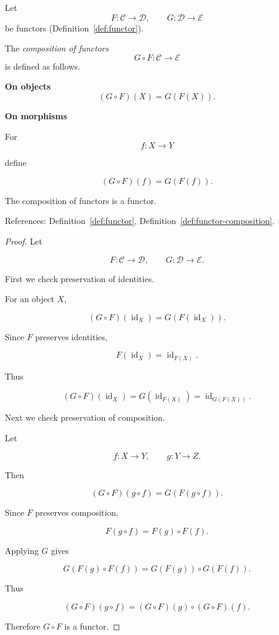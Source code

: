 \begin{definition}
\label{def:functor-composition}

Let
$$
F : \mathcal{C} \to \mathcal{D},
\qquad
G : \mathcal{D} \to \mathcal{E}
$$
be functors (Definition~\ref{def:functor}).

The \emph{composition of functors}
$$
G \circ F : \mathcal{C} \to \mathcal{E}
$$
is defined as follows.

\textbf{On objects}
$$
(G \circ F)(X) = G(F(X)).
$$

\textbf{On morphisms}

For
$$
f : X \to Y
$$

define

$$
(G \circ F)(f) = G(F(f)).
$$

\end{definition}

\begin{lemma}
\label{lem:functor-composition}

The composition of functors is a functor.

References: Definition~\ref{def:functor}, Definition~\ref{def:functor-composition}.
\end{lemma}

\begin{proof}

Let

$$
F : \mathcal{C} \to \mathcal{D},
\qquad
G : \mathcal{D} \to \mathcal{E}.
$$

First we check preservation of identities.

For an object $X$,

$$
(G \circ F)(\operatorname{id}_X)
=
G(F(\operatorname{id}_X)).
$$

Since $F$ preserves identities,

$$
F(\operatorname{id}_X) = \operatorname{id}_{F(X)}.
$$

Thus

$$
(G \circ F)(\operatorname{id}_X)
=
G(\operatorname{id}_{F(X)})
=
\operatorname{id}_{G(F(X))}.
$$

Next we check preservation of composition.

Let

$$
f : X \to Y,
\qquad
g : Y \to Z.
$$

Then

$$
(G \circ F)(g \circ f)
=
G(F(g \circ f)).
$$

Since $F$ preserves composition,

$$
F(g \circ f) = F(g) \circ F(f).
$$

Applying $G$ gives

$$
G(F(g) \circ F(f))
=
G(F(g)) \circ G(F(f)).
$$

Thus

$$
(G \circ F)(g \circ f)
=
(G \circ F)(g) \circ (G \circ F)(f).
$$

Therefore $G \circ F$ is a functor.

\end{proof}

